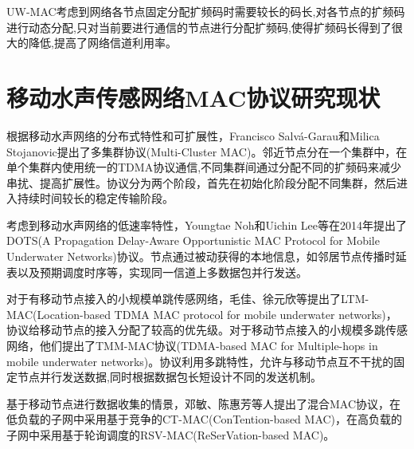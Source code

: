 UW-MAC\cite{watfa2010uw}考虑到网络各节点固定分配扩频码时需要较长的码长,对各节点的扩频码进行动态分配,只对当前要进行通信的节点进行分配扩频码,使得扩频码长得到了很大的降低,提高了网络信道利用率。

\section{移动水声传感网络MAC协议研究现状}
根据移动水声网络的分布式特性和可扩展性，Francisco Salvá-Garau和Milica Stojanovic提出了多集群协议(Multi-Cluster MAC)\cite{salva2003multi}。邻近节点分在一个集群中，在单个集群内使用统一的TDMA协议通信,不同集群间通过分配不同的扩频码来减少串扰、提高扩展性。协议分为两个阶段，首先在初始化阶段分配不同集群，然后进入持续时间较长的稳定传输阶段。

考虑到移动水声网络的低速率特性，Youngtae Noh和Uichin Lee等在2014年提出了DOTS(A Propagation Delay-Aware Opportunistic MAC Protocol for Mobile Underwater Networks)协议。节点通过被动获得的本地信息，如邻居节点传播时延表以及预期调度时序等，实现同一信道上多数据包并行发送。\cite{noh2014dots}

对于有移动节点接入的小规模单跳传感网络，毛佳、徐元欣等提出了LTM-MAC(Location-based TDMA MAC protocol for mobile underwater networks)\cite{mao2016ltm}，协议给移动节点的接入分配了较高的优先级。对于移动节点接入的小规模多跳传感网络，他们提出了TMM-MAC协议(TDMA-based MAC for Multiple-hops in mobile underwater networks)。协议利用多跳特性，允许与移动节点互不干扰的固定节点并行发送数据,同时根据数据包长短设计不同的发送机制。

基于移动节点进行数据收集的情景，邓敏、陈惠芳等人提出了混合MAC协议\cite{deng2017hybrid}，在低负载的子网中采用基于竞争的CT-MAC(ConTention-based MAC)，在高负载的子网中采用基于轮询调度的RSV-MAC(ReSerVation-based MAC)。



\endinput
